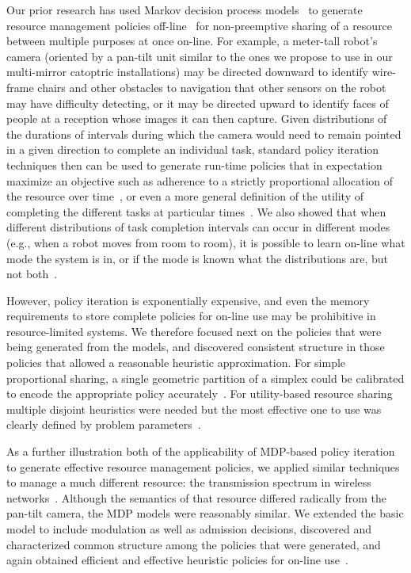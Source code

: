 Our prior research has used Markov decision process
models~\cite{gtsg08} to generate resource management policies
off-line~\cite{gtgs09} for non-preemptive sharing of a resource
between multiple purposes at once on-line.  For example, a meter-tall robot's
camera (oriented by a pan-tilt unit similar to the ones we propose to
use in our multi-mirror catoptric installations) may be directed
downward to identify wire-frame chairs and other obstacles to
navigation that other sensors on the robot may have difficulty
detecting, or it may be directed upward to identify faces of people at
a reception whose images it can then capture. Given distributions of
the durations of intervals during which the camera would need to
remain pointed in a given direction to complete an individual task,
standard policy iteration techniques then can be used to generate
run-time policies that in expectation maximize an objective such as
adherence to a strictly proportional allocation of the resource over
time~\cite{gtsg08}, or even a more general definition of the utility 
of completing the different tasks at particular times~\cite{tggs10}.
We also showed that when different distributions of task completion
intervals can occur in different modes (e.g., when a robot moves
from room to room), it is possible to learn on-line what mode
the system is in, or if the mode is known what the distributions are,
but not both~\cite{gtgsuai10}.

However, policy iteration is exponentially expensive, and even the memory 
requirements to store complete policies for on-line use may be prohibitive 
in resource-limited systems.  We therefore focused next on the policies 
that were being generated from the models, and discovered consistent 
structure in those policies that allowed a reasonable heuristic 
approximation.  For simple proportional sharing, a single geometric partition
of a simplex could be calibrated to encode the appropriate policy accurately~\cite{gtspmgs10}.
For utility-based resource sharing multiple disjoint heuristics were needed but
the most effective one to use was clearly defined by problem parameters~\cite{tblwgs11}.

As a further illustration both of the applicability of MDP-based
policy iteration to generate effective resource management policies,
we applied similar techniques to manage a much different resource:
the transmission spectrum in wireless networks~\cite{mskgct13}.  Although 
the semantics of that resource differed radically from the pan-tilt camera, 
the MDP models were reasonably similar.  We extended the basic model to
include modulation as well as admission decisions, discovered and characterized
common structure among the policies that were generated, and again obtained
efficient and effective heuristic policies for on-line use~\cite{mgc16}.

